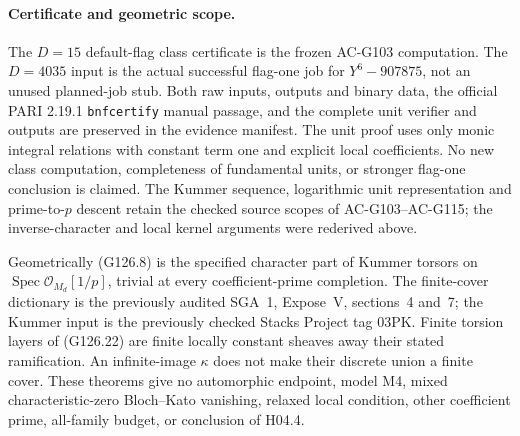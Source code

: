 \paragraph{Certificate and geometric scope.}
The \(D=15\) default-flag class certificate is the frozen
AC-G103 computation.  The \(D=4035\) input is the actual
successful flag-one job for \(Y^6-907875\), not an unused
planned-job stub.  Both raw inputs, outputs and binary
data, the official PARI 2.19.1 \texttt{bnfcertify} manual
passage, and the complete unit verifier and outputs are
preserved in the evidence manifest.
The unit proof uses only monic integral relations with
constant term one and explicit local coefficients.
No new class computation, completeness of fundamental
units, or stronger flag-one conclusion is claimed.
The Kummer sequence, logarithmic unit representation and
prime-to-\(p\) descent retain the checked source scopes
of AC-G103--AC-G115; the inverse-character and local
kernel arguments were rederived above.

Geometrically (G126.8) is the specified character part
of Kummer torsors on \(\operatorname{Spec}\mathcal O_{M_d}[1/p]\),
trivial at every coefficient-prime completion.
The finite-cover dictionary is the previously audited
SGA~1, Expose~V, sections~4 and~7; the Kummer input is
the previously checked Stacks Project tag 03PK.
Finite torsion layers of (G126.22) are finite locally
constant sheaves away their stated ramification.
An infinite-image \(\kappa\) does not make their discrete
union a finite cover.
These theorems give no automorphic endpoint, model M4,
mixed characteristic-zero Bloch--Kato vanishing,
relaxed local condition, other coefficient prime,
all-family budget, or conclusion of H04.4.

